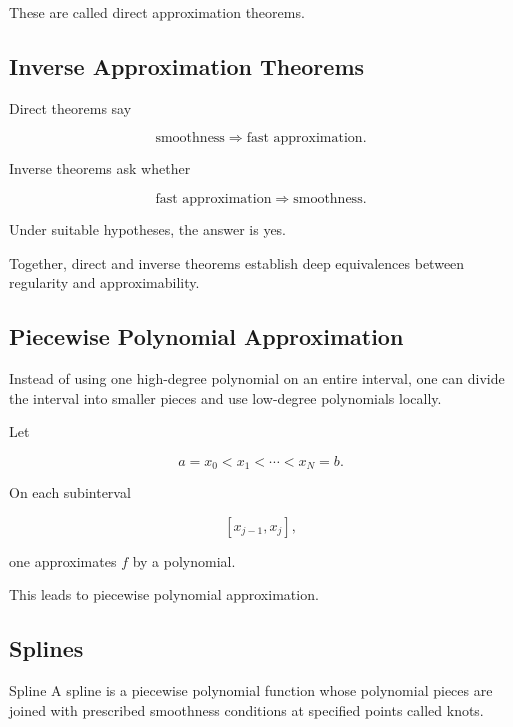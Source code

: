 These are called direct approximation theorems.

\subsection{Inverse Approximation Theorems}
\label{subsec:inverse-approximation-theorems}

Direct theorems say

\[
\boxed{
\text{smoothness}
\Longrightarrow
\text{fast approximation}.
}
\]

Inverse theorems ask whether

\[
\boxed{
\text{fast approximation}
\Longrightarrow
\text{smoothness}.
}
\]

Under suitable hypotheses, the answer is yes.

Together, direct and inverse theorems establish deep equivalences between
regularity and approximability.

\subsection{Piecewise Polynomial Approximation}
\label{subsec:piecewise-polynomial-approximation}

Instead of using one high-degree polynomial on an entire interval, one
can divide the interval into smaller pieces and use low-degree
polynomials locally.

Let

\[
a=x_0<x_1<\cdots<x_N=b.
\]

On each subinterval

\[
[x_{j-1},x_j],
\]

one approximates \(f\) by a polynomial.

This leads to piecewise polynomial approximation.

\subsection{Splines}
\label{subsec:splines}

\begin{definitionbox}{Spline}
A spline is a piecewise polynomial function whose polynomial pieces are
joined with prescribed smoothness conditions at specified points called
knots.
\end{definitionbox}

